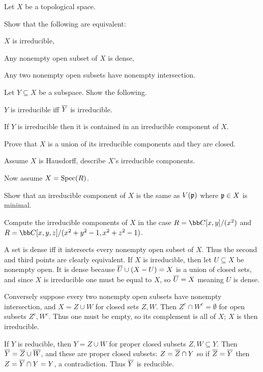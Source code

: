     Let $X$ be a topological space.
    \benum
        \item Show that the following are equivalent:
        \benum
            \item $X$ is irreducible,
            \item Any nonempty open subset of $X$ is dense,
            \item Any two nonempty open subsets have nonempty intersection.
        \eenum
        \item Let $Y\subseteq X$ be a subspace.
        Show the following.
        \benum
            \item $Y$ is irreducible iff ${\overline{Y}}$ is irreducible.
            \item If $Y$ is irreducible then it is contained in an irreducible component of $X$.
        \eenum
        \item Prove that $X$ is a union of its irreducible components and they are closed.
        \item Assume $X$ is Hausdorff, describe $X$'s irreducible components.
        \item Now assume $X={\rm Spec}(R)$.
        \benum
            \item Show that an irreducible component of $X$ is the same as $V({{\frak p}})$ where ${{\frak p}}\in X$ is minimal.
            \item Compute the irreducible components of $X$ in the case $R=\bC[x,y]/(x^2)$ and $R=\bC[x,y,z]/(x^2+y^2-1,x^2+z^2-1)$.
        \eenum
    \eenum

\eprob

\benum
    \item A set is dense iff it intersects every nonempty open subset of $X$.
    Thus the second and third points are clearly equivalent.
    If $X$ is irreducible, then let $U\subseteq X$ be nonempty open.
    It is dense because ${\overline{U}}\cup(X-U)=X$ is a union of closed sets, and since $X$ is irreducible one must be equal to $X$, so ${\overline{U}}=X$ meaning $U$ is dense.

    Conversely suppose every two nonempty open subsets have nonempty intersection, and $X=Z\cup W$ for closed sets $Z,W$.
    Then $Z^c\cap W^c=\emptyset$ for open subsets $Z^c,W^c$.
    Thus one must be empty, so its complement is all of $X$; $X$ is then irreducible.

    \item If $Y$ is reducible, then $Y=Z\cup W$ for proper closed subsets $Z,W\subseteq Y$.
    Then ${\overline{Y}}={\overline{Z}}\cup{\overline{W}}$, and these are proper closed subsets: $Z={\overline{Z}}\cap Y$ so if ${\overline{Z}}={\overline{Y}}$ then $Z={\overline{Y}}\cap Y=Y$, a contradiction.
    Thus ${\overline{Y}}$ is reducible.

